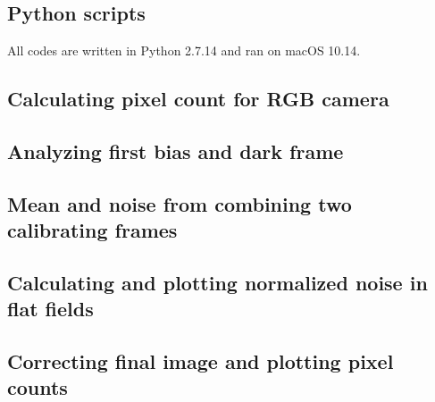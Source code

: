 \documentclass{emulateapj}
\begin{document}
\begin{appendices}
\section{Python scripts}
\label{asec: Python scripts}
All codes are written in Python 2.7.14 and ran on macOS 10.14.
\subsection{Calculating pixel count for RGB camera}

\subsection{Analyzing first bias and dark frame}

\subsection{Mean and noise from combining two calibrating frames}

\subsection{Calculating and plotting normalized noise in flat fields}

\subsection{Correcting final image and plotting pixel counts}

\end{appendices}
\end{document}
